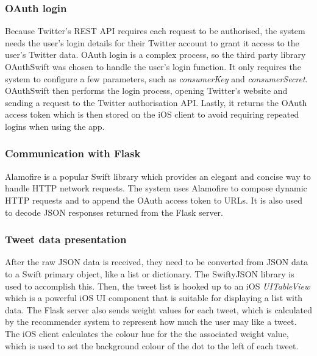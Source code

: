 \documentclass{article}
\begin{document}
\subsubsection*{OAuth login} %
Because Twitter's REST API requires each request to be authorised, the system needs the user's login details for their Twitter account to grant it access to the user's Twitter data. OAuth login is a complex process, so the third party library OAuthSwift \cite{oauthswift} was chosen to handle the user's login function. It only requires the system to configure a few parameters, such as \textit{consumerKey} and \textit{consumerSecret}. OAuthSwift then performs the login process, opening Twitter's website and sending a request to the Twitter authorisation API. Lastly, it returns the OAuth access token which is then stored on the iOS client to avoid requiring repeated logins when using the app.

\subsubsection*{Communication with Flask} %
Alamofire \cite{alamofire} is a popular Swift library which provides an elegant and concise way to handle HTTP network requests. The system uses Alamofire to compose dynamic HTTP requests and to append the OAuth access token to URLs. It is also used to decode JSON responses returned from the Flask server.

\subsubsection*{Tweet data presentation} %
After the raw JSON data is received, they need to be converted from JSON data to a Swift primary object, like a list or dictionary. The SwiftyJSON \cite{swiftyjson} library is used to accomplish this. Then, the tweet list is hooked up to an iOS \textit{UITableView} which is a powerful iOS UI component that is suitable for displaying a list with data. The Flask server also sends weight values for each tweet, which is calculated by the recommender system to represent how much the user may like a tweet. The iOS client calculates the colour hue for the the associated weight value, which is used to set the background colour of the dot to the left of each tweet.


\newpage
\end{document}

